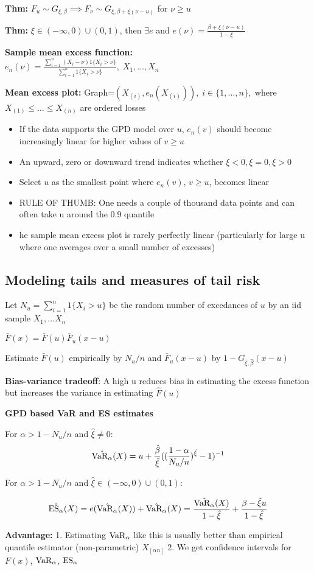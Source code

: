 \textbf{Thm:} $F_u\sim G_{\xi,\beta} \implies F_\nu\sim G_{\xi,\beta+\xi(\nu-u)}$ for $\nu\geq u$

\textbf{Thm:} $\xi\in (-\infty, 0)\cup (0,1)$, then $\exists e$ and $e(\nu)=\frac{\beta+\xi(\nu - u)}{1-\xi}$

\textbf{Sample mean excess function:}\\
$e_n(\nu)=\frac{\sum^n_{i=1}(X_i-\nu)1\{X_i>\nu \}}{\sum^n_{i=1}1\{X_i>\nu \}},\; X_1,\dots,X_n$

\textbf{Mean excess plot:} Graph=$(X_{(i)},e_n(X_{(i)})),\; i\in\{1,\dots,n\},$ where $X_{(1)}\leq\dots\leq X_{(n)}$ are ordered losses

\begin{itemize}
    \item If the data supports the GPD model over $u$, $e_n(v)$ should become increasingly linear for higher values of $v\geq u$
    \item An upward, zero or downward trend indicates whether $\xi<0,\xi=0,\xi>0$
    \item Select $u$ as the smallest point where $e_n(v)$, $v \geq u$, becomes linear
    \item RULE OF THUMB: One needs a couple of thousand data points and can often take u around the 0.9 quantile
    \item he sample mean excess plot is rarely perfectly linear
(particularly for large u where one averages over a small number of excesses)
\end{itemize}

\subsection*{Modeling tails and measures of tail risk}
Let $N_u = \sum^n_{i=1} 1\{X_i >u\}$ be the random number of excedances of $u$ by an iid sample $X_1, \dots X_n$

$\bar F(x)=\bar F(u)\bar F_u(x-u)$

Estimate  $\bar F(u)$ empirically by $N_u/n$ and  $\bar F_u(x - u)$ by $1 - G_{\hat\xi,\hat\beta}(x - u)$

\textbf{Bias-variance tradeoff}: A high u reduces bias in estimating the excess function but increases the variance in estimating  $\hat F(u)$

\textbf{GPD based VaR and ES estimates}

For $ \alpha > 1 - N_u/n$ and $\hat\xi  \neq 0:$
\[ \hat {\text{VaR}_\alpha}(X) = u + \frac{\hat\beta}{ \hat\xi} ((\frac{ 1 - \alpha}{ N_u/n})^{\hat \xi} -1 )^{-1}
\]

For $ \alpha > 1 - N_u/n$ and $\hat\xi  \in (-\infty,0) \cup (0,1):$

\[ \hat {\text{ES}_\alpha} (X) = e(\hat {\text{VaR}_\alpha}(X))+\hat {\text{VaR}_\alpha}(X)=\frac{\hat {\text{VaR}_\alpha}(X)}{1-\hat\xi}+\frac{\beta -\hat \xi u }{1-\hat \xi}\]

\textbf{Advantage:} 1. Estimating $\text{VaR}_\alpha$ like this is usually better than empirical quantile estimator (non-parametric) $X_{[\alpha n]}$
2. We get confidence intervals for $F(x)$, $\text{VaR}_\alpha$, $\text{ES}_\alpha$